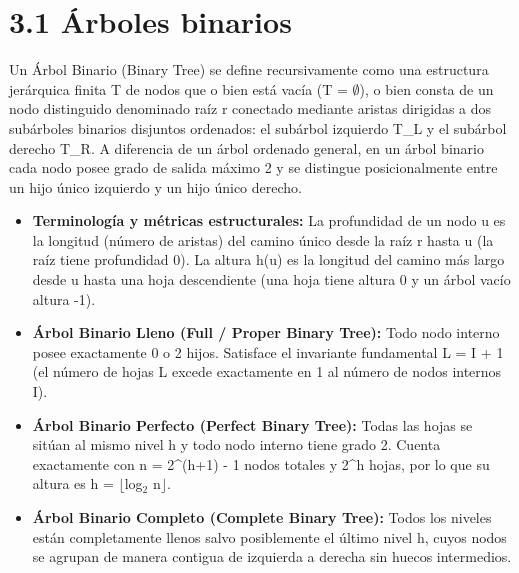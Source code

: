 \documentclass[11pt,letterpaper]{article}
\begin{document}
\section*{3.1 Árboles binarios}
Un Árbol Binario (Binary Tree) se define recursivamente como una estructura jerárquica finita T de nodos que o bien está vacía (T = $\emptyset$), o bien consta de un nodo distinguido denominado raíz r conectado mediante aristas dirigidas a dos subárboles binarios disjuntos ordenados: el subárbol izquierdo T\_L y el subárbol derecho T\_R. A diferencia de un árbol ordenado general, en un árbol binario cada nodo posee grado de salida máximo 2 y se distingue posicionalmente entre un hijo único izquierdo y un hijo único derecho.\par
\begin{itemize}
\setlength{\itemsep}{2pt}\setlength{\parskip}{0pt}
  \item \textbf{Terminología y métricas estructurales: }La profundidad de un nodo u es la longitud (número de aristas) del camino único desde la raíz r hasta u (la raíz tiene profundidad 0). La altura h(u) es la longitud del camino más largo desde u hasta una hoja descendiente (una hoja tiene altura 0 y un árbol vacío altura -1).
  \item \textbf{Árbol Binario Lleno (Full / Proper Binary Tree): }Todo nodo interno posee exactamente 0 o 2 hijos. Satisface el invariante fundamental L = I + 1 (el número de hojas L excede exactamente en 1 al número de nodos internos I).
  \item \textbf{Árbol Binario Perfecto (Perfect Binary Tree): }Todas las hojas se sitúan al mismo nivel h y todo nodo interno tiene grado 2. Cuenta exactamente con n = 2\textasciicircum{}(h+1) - 1 nodos totales y 2\textasciicircum{}h hojas, por lo que su altura es h = $\lfloor$log$_2$ n$\rfloor$.
  \item \textbf{Árbol Binario Completo (Complete Binary Tree): }Todos los niveles están completamente llenos salvo posiblemente el último nivel h, cuyos nodos se agrupan de manera contigua de izquierda a derecha sin huecos intermedios.
\end{itemize}
\end{document}
